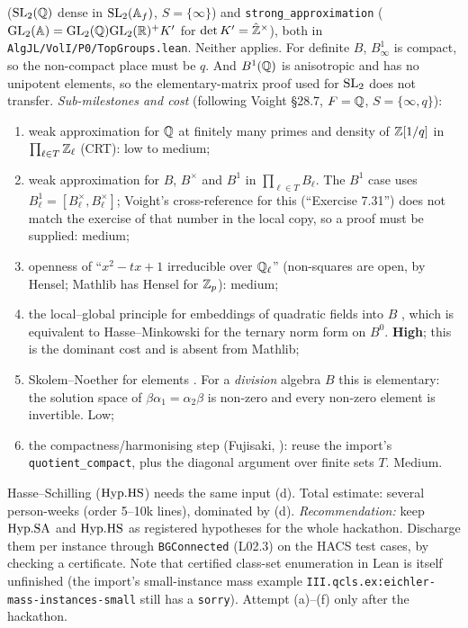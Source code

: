 \begin{itemize}
  ($\mathrm{SL}_2(\mathbb{Q})$ dense in $\mathrm{SL}_2(\mathbb{A}_f)$, $S=\{\infty\}$) and \texttt{strong\_approximation}
  ($\mathrm{GL}_2(\mathbb{A})=\mathrm{GL}_2(\mathbb{Q})\mathrm{GL}_2(\mathbb{R})^+K'$ for $\det K'=\hat{\mathbb{Z}}^\times$), both in
  \texttt{AlgJL/VolI/P0/TopGroups.lean}. Neither applies. For definite $B$, $B^1_\infty$ is compact, so the
  non-compact place must be $q$. And $B^1(\mathbb{Q})$ is anisotropic and has no unipotent elements, so the
  elementary-matrix proof used for $\mathrm{SL}_2$ does not transfer.
  \emph{Sub-milestones and cost} (following Voight \S28.7, $F=\mathbb{Q}$, $S=\{\infty,q\}$):
  \begin{enumerate}[label=(\alph*)]
  \item weak approximation for $\mathbb{Q}$ at finitely many primes and density of $\mathbb{Z}[1/q]$ in $\prod_{\ell\in T}\mathbb{Z}_\ell$
    (CRT): low to medium;
  \item weak approximation for $B$, $B^\times$ and $B^1$ in $\prod_{\ell\in T}B_\ell$. The $B^1$ case uses
    $B_\ell^1=[B_\ell^\times,B_\ell^\times]$; Voight's cross-reference for this (``Exercise 7.31'') does not
    match the exercise of that number in the local copy, so a proof must be supplied: medium;
  \item openness of ``$x^2-tx+1$ irreducible over $\mathbb{Q}_\ell$'' (non-squares are open, by Hensel; Mathlib has
    Hensel for $\mathbb{Z}_p$): medium;
  \item the local--global principle for embeddings of quadratic fields into $B$
    , which is equivalent to Hasse--Minkowski for
    the ternary norm form on $B^0$. \textbf{High}; this is the dominant cost and is absent from Mathlib;
  \item Skolem--Noether for elements . For a
    \emph{division} algebra $B$ this is elementary: the solution space of $\beta\alpha_1=\alpha_2\beta$ is
    non-zero and every non-zero element is invertible. Low;
  \item the compactness/harmonising step (Fujisaki, ): reuse the import's \texttt{quotient\_compact}, plus the diagonal argument over finite sets $T$.
    Medium.
  \end{enumerate}
  Hasse--Schilling ($\mathrm{Hyp.HS}$) needs the same input (d). Total estimate: several person-weeks (order 5--10k lines),
  dominated by (d). \emph{Recommendation:} keep $\mathrm{Hyp.SA}$ and $\mathrm{Hyp.HS}$ as registered hypotheses for the whole
  hackathon. Discharge them per instance through \texttt{BGConnected} (L02.3) on the HACS test cases, by checking a
  certificate. Note that certified class-set enumeration in Lean is itself unfinished (the import's small-instance
  mass example \texttt{III.qcls.ex:eichler-mass-instances-small} still has a \texttt{sorry}). Attempt (a)--(f) only
  after the hackathon.
\end{itemize}

